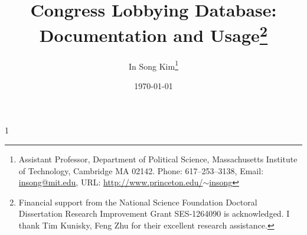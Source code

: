 \documentclass[11pt,letterpaper]{article}
\theoremstyle{plain}
\newcommand{\blind}{1}
\begin{document}
\newcommand\ud{\mathrm{d}}
\newcommand\dist{\buildrel\rm d\over\sim}
\newcommand\ind{\stackrel{\rm indep.}{\sim}}
\newcommand\iid{\stackrel{\rm i.i.d.}{\sim}}
\newcommand\logit{{\rm logit}}
\renewcommand\r{\right}
\renewcommand\l{\left}
\newcommand\cY{\mathcal{Y}}
\newcommand\cZ{\mathcal{Z}}
\newcommand\E{\mathbb{E}}
\newcommand\V{\mathbb{V}}
\newcommand\wY{\widetilde{Y}}
\newcommand\cE{\mathcal{E}}
\newcommand\cN{\mathcal{N}}
\newcommand\cX{\mathcal{X}}
\newcommand\bA{\mathbf{A}}
\newcommand\bB{\mathbf{B}}
\newcommand\bI{\mathbf{I}}
\newcommand\bt{\mathbf{t}}
\newcommand\bz{\mathbf{z}}
\newcommand\bone{\mathbf{1}}
\newcommand\bzero{\mathbf{0}}
\newcommand\tomega{\tilde\omega}
\newcommand{\argmax}{\operatornamewithlimits{argmax}}

\newcommand\spacingset[1]{\renewcommand{\baselinestretch}%
{#1}\small\normalsize}

\spacingset{1}

\newcommand{\tit}{\bf Congress Lobbying Database:\\ Documentation and Usage}


\blind


\author{In Song Kim\thanks{Assistant Professor, Department of
    Political Science, Massachusetts Institute of Technology,
    Cambridge MA 02142. Phone: 617--253--3138, Email:
    \href{mailto:insong@mit.edu}{insong@mit.edu}, URL:
    \href{http://www.princeton.edu/~insong}{http://www.princeton.edu/$\sim$insong}}}


{\title{\tit\thanks{Financial support from the National Science
      Foundation Doctoral Dissertation Research Improvement Grant
      SES-1264090 is acknowledged. I thank Tim Kunisky, Feng Zhu for
      their excellent research assistance.}}

  \date{\today}

\maketitle
}\fi


\thispagestyle{empty}
\setcounter{page}{0}


\end{document}
